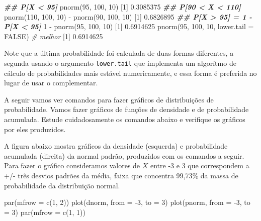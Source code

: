 \documentclass[
  10pt,
  a4paper]{book}
\newenvironment{Shaded}{\begin{snugshade}}{\end{snugshade}}
\newcommand{\AttributeTok}[1]{\textcolor[rgb]{0.77,0.63,0.00}{#1}}
\newcommand{\CommentTok}[1]{\textcolor[rgb]{0.56,0.35,0.01}{\textit{#1}}}
\newcommand{\ConstantTok}[1]{\textcolor[rgb]{0.00,0.00,0.00}{#1}}
\newcommand{\DecValTok}[1]{\textcolor[rgb]{0.00,0.00,0.81}{#1}}
\newcommand{\DocumentationTok}[1]{\textcolor[rgb]{0.56,0.35,0.01}{\textbf{\textit{#1}}}}
\newcommand{\FloatTok}[1]{\textcolor[rgb]{0.00,0.00,0.81}{#1}}
\newcommand{\FunctionTok}[1]{\textcolor[rgb]{0.00,0.00,0.00}{#1}}
\newcommand{\NormalTok}[1]{#1}
\newcommand{\SpecialCharTok}[1]{\textcolor[rgb]{0.00,0.00,0.00}{#1}}
\begin{document}
\begin{Shaded}
\begin{Highlighting}[]
\DocumentationTok{\#\# P[X \textless{} 95]}
\FunctionTok{pnorm}\NormalTok{(}\DecValTok{95}\NormalTok{, }\DecValTok{100}\NormalTok{, }\DecValTok{10}\NormalTok{)}
\NormalTok{[}\DecValTok{1}\NormalTok{] }\FloatTok{0.3085375}
\DocumentationTok{\#\# P[90 \textless{} X \textless{} 110]}
\FunctionTok{pnorm}\NormalTok{(}\DecValTok{110}\NormalTok{, }\DecValTok{100}\NormalTok{, }\DecValTok{10}\NormalTok{) }\SpecialCharTok{{-}} \FunctionTok{pnorm}\NormalTok{(}\DecValTok{90}\NormalTok{, }\DecValTok{100}\NormalTok{, }\DecValTok{10}\NormalTok{)}
\NormalTok{[}\DecValTok{1}\NormalTok{] }\FloatTok{0.6826895}
\DocumentationTok{\#\# P[X \textgreater{} 95] = 1 {-} P[X \textless{} 95]}
\DecValTok{1} \SpecialCharTok{{-}} \FunctionTok{pnorm}\NormalTok{(}\DecValTok{95}\NormalTok{, }\DecValTok{100}\NormalTok{, }\DecValTok{10}\NormalTok{)}
\NormalTok{[}\DecValTok{1}\NormalTok{] }\FloatTok{0.6914625}
\FunctionTok{pnorm}\NormalTok{(}\DecValTok{95}\NormalTok{, }\DecValTok{100}\NormalTok{, }\DecValTok{10}\NormalTok{, }\AttributeTok{lower.tail =} \ConstantTok{FALSE}\NormalTok{) }\CommentTok{\# melhor}
\NormalTok{[}\DecValTok{1}\NormalTok{] }\FloatTok{0.6914625}
\end{Highlighting}
\end{Shaded}

Note que a última probabilidade foi calculada de duas formas diferentes,
a segunda usando o argumento \texttt{lower.tail} que implementa um algorítmo de
cálculo de probabilidades mais estável numericamente, e essa forma é
preferida no lugar de usar o complementar.

A seguir vamos ver comandos para fazer gráficos de distribuições de
probabilidade. Vamos fazer gráficos de funções de densidade e de
probabilidade acumulada. Estude cuidadosamente os comandos abaixo e
verifique os gráficos por eles produzidos.

A figura abaixo mostra gráficos da densidade (esquerda) e probabilidade
acumulada (direita) da normal padrão, produzidos com os comandos a
seguir. Para fazer o gráfico consideramos valores de \(X\) entre -3 e 3
que correspondem a +/- três desvios padrões da média, faixa que
concentra 99,73\% da massa de probabilidade da distribuição normal.

\begin{Shaded}
\begin{Highlighting}[]
\FunctionTok{par}\NormalTok{(}\AttributeTok{mfrow =} \FunctionTok{c}\NormalTok{(}\DecValTok{1}\NormalTok{, }\DecValTok{2}\NormalTok{))}
\FunctionTok{plot}\NormalTok{(dnorm, }\AttributeTok{from =} \SpecialCharTok{{-}}\DecValTok{3}\NormalTok{, }\AttributeTok{to =} \DecValTok{3}\NormalTok{)}
\FunctionTok{plot}\NormalTok{(pnorm, }\AttributeTok{from =} \SpecialCharTok{{-}}\DecValTok{3}\NormalTok{, }\AttributeTok{to =} \DecValTok{3}\NormalTok{)}
\FunctionTok{par}\NormalTok{(}\AttributeTok{mfrow =} \FunctionTok{c}\NormalTok{(}\DecValTok{1}\NormalTok{, }\DecValTok{1}\NormalTok{))}
\end{Highlighting}
\end{Shaded}
\end{document}
